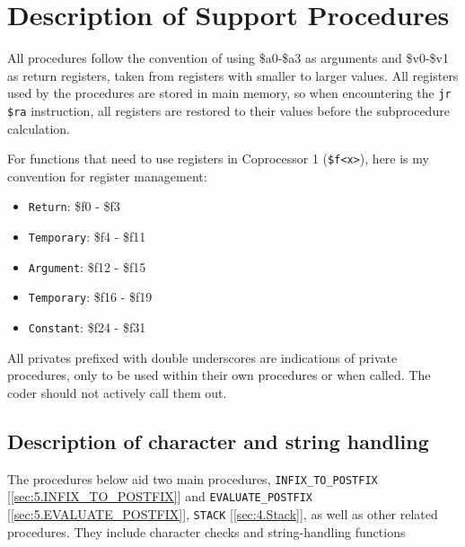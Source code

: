 \renewcommand{\arraystretch}{1.5}

\section{Description of Support Procedures}

\label{sec:3.SupportProcedures}

All procedures follow the convention of using \$a0-\$a3 as arguments and \$v0-\$v1 as return registers, taken from registers with smaller to larger values. All registers used by the procedures are stored in main memory, so when encountering the \texttt{jr \$ra} instruction, all registers are restored to their values before the subprocedure calculation.

For functions that need to use registers in Coprocessor 1 (\texttt{\$f<x>}), here is my convention for register management:

\begin{itemize}
    \label{sec:3.Coprocessor Management}
    \item \verb|Return|\space\space\space\space: \$f0 - \$f3
    \item \verb|Temporary|: \$f4 - \$f11
    \item \verb|Argument|\space\space: \$f12 - \$f15
    \item \verb|Temporary|: \$f16 - \$f19
    \item \verb|Constant|\space\space: \$f24 - \$f31
\end{itemize}

All privates prefixed with double underscores are indications of private procedures, only to be used within their own procedures or when called. The coder should not actively call them out.

\subsection{Description of character and string handling}
    The procedures below aid two main procedures, \texttt{INFIX\_TO\_POSTFIX} [\ref{sec:5.INFIX_TO_POSTFIX}] and \texttt{EVALUATE\_POSTFIX} [\ref{sec:5.EVALUATE_POSTFIX}], \texttt{STACK} [\ref{sec:4.Stack}], as well as other related procedures. They include character checks and string-handling functions
    
